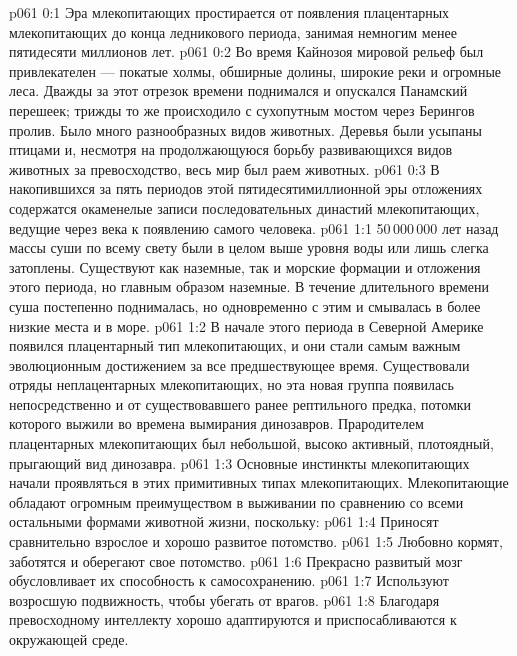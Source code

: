 \author{Носитель Жизни}
\vs p061 0:1 Эра млекопитающих простирается от появления плацентарных млекопитающих до конца ледникового периода, занимая немногим менее пятидесяти миллионов лет.
\vs p061 0:2 Во время Кайнозоя мировой рельеф был привлекателен --- покатые холмы, обширные долины, широкие реки и огромные леса. Дважды за этот отрезок времени поднимался и опускался Панамский перешеек; трижды то же происходило с сухопутным мостом через Берингов пролив. Было много разнообразных видов животных. Деревья были усыпаны птицами и, несмотря на продолжающуюся борьбу развивающихся видов животных за превосходство, весь мир был раем животных.
\vs p061 0:3 В накопившихся за пять периодов этой пятидесятимиллионной эры отложениях содержатся окаменелые записи последовательных династий млекопитающих, ведущие через века к появлению самого человека.
\vs p061 1:1 50\,000\,000 лет назад массы суши по всему свету были в целом выше уровня воды или лишь слегка затоплены. Существуют как наземные, так и морские формации и отложения этого периода, но главным образом наземные. В течение длительного времени суша постепенно поднималась, но одновременно с этим и смывалась в более низкие места и в море.
\vs p061 1:2 В начале этого периода в Северной Америке  появился плацентарный тип млекопитающих, и они стали самым важным эволюционным достижением за все предшествующее время. Существовали отряды неплацентарных млекопитающих, но эта новая группа появилась непосредственно и  от существовавшего ранее рептильного предка, потомки которого выжили во времена вымирания динозавров. Прародителем плацентарных млекопитающих был небольшой, высоко активный, плотоядный, прыгающий вид динозавра.
\vs p061 1:3 Основные инстинкты млекопитающих начали проявляться в этих примитивных типах млекопитающих. Млекопитающие обладают огромным преимуществом в выживании по сравнению со всеми остальными формами животной жизни, поскольку:
\vs p061 1:4 \bibnobreakspace Приносят сравнительно взрослое и хорошо развитое потомство.
\vs p061 1:5 \bibnobreakspace Любовно кормят, заботятся и оберегают свое потомство.
\vs p061 1:6 \pc {}\bibnobreakspace Прекрасно развитый мозг обусловливает их способность к самосохранению.
\vs p061 1:7 \bibnobreakspace Используют возросшую подвижность, чтобы убегать от врагов.
\vs p061 1:8 \bibnobreakspace Благодаря превосходному интеллекту хорошо адаптируются и приспосабливаются к окружающей среде.

